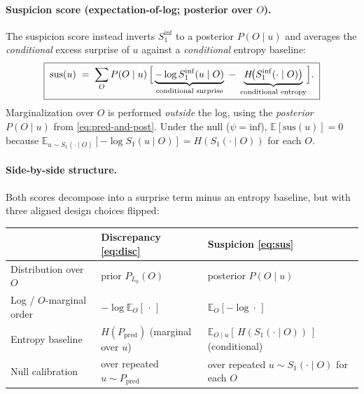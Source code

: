 \paragraph{Suspicion score (expectation-of-log; posterior over $O$).}
The suspicion score instead inverts $S_1^{\mathrm{inf}}$ to a posterior
$P(O\mid u)$ and averages the \emph{conditional} excess surprise of $u$
against a \emph{conditional} entropy baseline:
\begin{equation}
  \boxed{\;
    \mathrm{sus}(u) \;=\; \sum_{O} P(O\mid u)\, \Bigl[\,
         \underbrace{-\log S_1^{\mathrm{inf}}(u\mid O)}_{\text{conditional surprise}}
         \;-\; \underbrace{H\!\bigl(S_1^{\mathrm{inf}}(\cdot\mid O)\bigr)}_{\text{conditional entropy}}
       \Bigr].\;}
  \label{eq:sus}
\end{equation}
Marginalization over $O$ is performed \emph{outside} the log, using the
\emph{posterior} $P(O\mid u)$ from \eqref{eq:pred-and-post}.  Under the null
($\psi=\mathrm{inf}$), $\mathbb{E}[\mathrm{sus}(u)]=0$ because
$\mathbb{E}_{u\sim S_1(\cdot\mid O)}[-\log S_1(u\mid O)] = H(S_1(\cdot\mid O))$
for each $O$.

\paragraph{Side-by-side structure.}
Both scores decompose into a surprise term minus an entropy baseline, but
with three aligned design choices flipped:

\begin{center}
\renewcommand{\arraystretch}{1.35}
\begin{tabular}{lll}
\toprule
 & \textbf{Discrepancy} \eqref{eq:disc} & \textbf{Suspicion} \eqref{eq:sus} \\
\midrule
Distribution over $O$ & prior $P_{L_0}(O)$ & posterior $P(O\mid u)$ \\
Log / $O$-marginal order & $-\log \mathbb{E}_O[\,\cdot\,]$ & $\mathbb{E}_O[-\log \cdot\,]$ \\
Entropy baseline         & $H(P_{\mathrm{pred}})$ (marginal over $u$) & $\mathbb{E}_{O\mid u}[\,H(S_1(\cdot\mid O))\,]$ (conditional) \\
Null calibration         & over repeated $u\sim P_{\mathrm{pred}}$ & over repeated $u\sim S_1(\cdot\mid O)$ for each $O$ \\
\bottomrule
\end{tabular}
\end{center}


